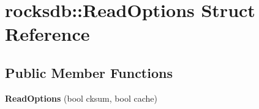 \hypertarget{structrocksdb_1_1ReadOptions}{}\section{rocksdb\+:\+:Read\+Options Struct Reference}
\label{structrocksdb_1_1ReadOptions}
\subsection*{Public Member Functions}
\begin{DoxyCompactItemize}
\item 
{\bfseries Read\+Options} (bool cksum, bool cache)\hypertarget{structrocksdb_1_1ReadOptions_ac9b946816028ad40b43edbe44f96974e}{}\label{structrocksdb_1_1ReadOptions_ac9b946816028ad40b43edbe44f96974e}

\end{DoxyCompactItemize}
